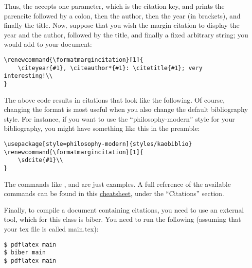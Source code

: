 Thus, the  accepts one parameter, which is 
the citation key, and prints the parencite followed by a colon, then the 
author, then the year (in brackets), and finally the 
title. Now, suppose that you wish the margin 
citation to display the year and the author, followed by the title, and 
finally a fixed arbitrary string; you would add to your document:

\begin{lstlisting}[style=kaolstplain,linewidth=1.5\textwidth]
\renewcommand{\formatmargincitation}[1]{
	\citeyear{#1}, \citeauthor*{#1}: \citetitle{#1}; very interesting!\\
}
\end{lstlisting}


The above code results in citations that look like the 
following. Of course, changing the format is most 
useful when you also change the default bibliography style. For 
instance, if you want to use the \enquote{philosophy-modern} style for 
your bibliography, you might have something like this in the preamble:

\begin{lstlisting}[style=kaolstplain,linewidth=1.5\textwidth]
\usepackage[style=philosophy-modern]{styles/kaobiblio}
\renewcommand{\formatmargincitation}[1]{
	\sdcite{#1}\\
}

\end{lstlisting}


The commands like ,  and 
 are just examples. A full reference of the available 
commands can be found in this 
\href{http://tug.ctan.org/info/biblatex-cheatsheet/biblatex-cheatsheet.pdf}{cheatsheet}, 
under the \enquote{Citations} section.

Finally, to compile a document containing citations, you need to use an 
external tool, which for this class is biber. You need to run the 
following (assuming that your tex file is called main.tex):

\begin{lstlisting}[style=kaolstplain]
$ pdflatex main
$ biber main
$ pdflatex main
\end{lstlisting}


